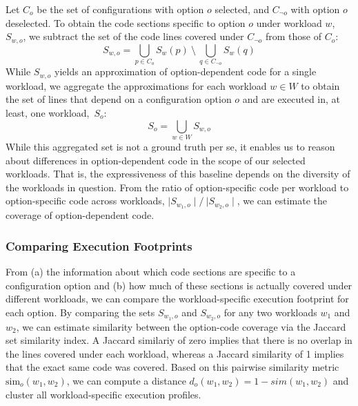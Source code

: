 Let $C_{o}$ be the set of configurations with option $o$ selected, and $C_{\neg o}$ with option $o$ deselected. To obtain the code sections specific to option $o$ under workload $w$, $S_{w, o}$, we subtract the set of the code lines covered under $C_{\neg o}$ from those of $C_{o}$:
\begin{equation}%
	S_{w, o} = \bigcup_{p \in C_{o}} S_{w}(p) ~ \setminus ~ \bigcup_{q \in C_{\neg o}} S_{w}(q)
\end{equation}
While $S_{w, o}$ yields an approximation of option-dependent code for a single workload, we aggregate the approximations for each workload $w\in W$ to obtain the set of lines that depend on a configuration option $o$ and are executed in, at least, one workload,~$S_{o}$: 
\begin{equation}
	S_{o} = \bigcup_{w \in W} S_{w, o}
\end{equation}
While this aggregated set is not a ground truth per se, it enables us to reason about differences in option-dependent code in the scope of our selected workloads. That is, the expressiveness of this baseline depends on the diversity of the workloads in question. From the ratio of option-specific code per workload to option-specific code across workloads, $\mid S_{w_1, o}\mid/~{\mid S_{w_2, o}\mid}$, we can estimate the coverage of option-dependent code. 

\subsubsection{Comparing Execution Footprints}
From (a) the information about which code sections are specific to a configuration option and (b) how much of these sections is actually covered under different workloads, we can compare the workload-specific execution footprint for each option. By comparing the sets $S_{w_1, o}$ and $S_{w_2, o}$ for any two workloads $w_1$ and $w_2$, we can estimate similarity between the option-code coverage via the Jaccard set similarity index. A Jaccard similariy of zero implies that there is no overlap in the lines covered under each workload, whereas a Jaccard similarity of 1 implies that the exact same code was covered. Based on this pairwise similarity metric $\text{sim}_o(w_1, w_2)$, we can compute a distance $d_o(w_1, w_2) = 1 - sim(w_1, w_2)$ and cluster all workload-specific execution profiles. 

